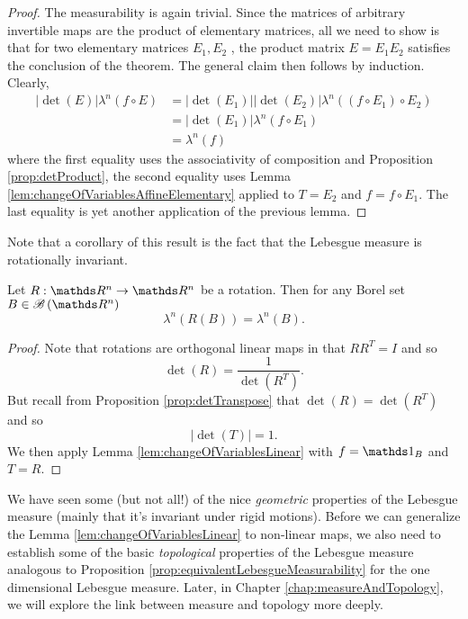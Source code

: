 \begin{proof}
The measurability is again trivial. Since the matrices of arbitrary
invertible maps are the product of elementary matrices, all we need
to show is that for two elementary matrices $E_{1},E_{2}$ , the product
matrix $E=E_{1}E_{2}$ satisfies the conclusion of the theorem. The
general claim then follows by induction. Clearly, 
\begin{align*}
\lvert\det\left(E\right)\rvert\lambda^{n}\left(f\circ E\right) & =\lvert\det\left(E_{1}\right)\rvert\lvert\det\left(E_{2}\right)\rvert\lambda^{n}\left(\left(f\circ E_{1}\right)\circ E_{2}\right)\\
 & =\lvert\det\left(E_{1}\right)\rvert\lambda^{n}\left(f\circ E_{1}\right)\\
 & =\lambda^{n}\left(f\right)
\end{align*}
where the first equality uses the associativity of composition and
Proposition \ref{prop:detProduct}, the second equality uses Lemma
\ref{lem:changeOfVariablesAffineElementary} applied to $T=E_{2}$
and $f=f\circ E_{1}$. The last equality is yet another application
of the previous lemma.
\end{proof}
Note that a corollary of this result is the fact that the Lebesgue
measure is rotationally invariant.
\begin{cor}
\label{cor:lebesgueRotationalInvariance}Let $R:\R^{n}\to\R^{n}$
be a rotation. Then for any Borel set $B\in\borel\left(\R^{n}\right)$
\[
\lambda^{n}\left(R\left(B\right)\right)=\lambda^{n}\left(B\right).
\]
\end{cor}

\begin{proof}
Note that rotations are orthogonal linear maps in that $RR^{T}=I$
and so 
\[
\det\left(R\right)=\frac{1}{\det\left(R^{T}\right)}.
\]
But recall from Proposition \ref{prop:detTranspose} that $\det\left(R\right)=\det\left(R^{T}\right)$
and so
\[
\lvert\det\left(T\right)\rvert=1.
\]
We then apply Lemma  \ref{lem:changeOfVariablesLinear} with $f=\indicate_{B}$
and $T=R$.
\end{proof}

We have seen some (but not all!) of the nice \emph{geometric} properties of the Lebesgue measure (mainly that it's invariant under rigid motions). Before we can generalize the Lemma \ref{lem:changeOfVariablesLinear} to non-linear maps, we also need to establish some of the basic \emph{topological} properties of the Lebesgue measure analogous to Proposition \ref{prop:equivalentLebesgueMeasurability} for the one dimensional Lebesgue measure. Later, in Chapter \ref{chap:measureAndTopology}, we will explore the link between measure and topology more deeply.

